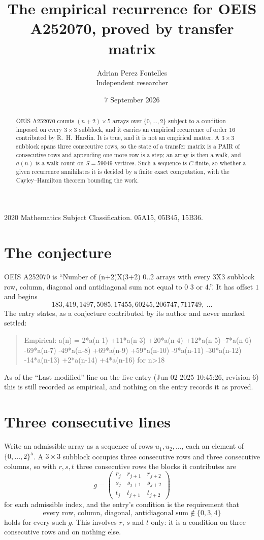 \documentclass[11pt,a4paper]{article}
\title{The empirical recurrence for OEIS A252070, proved by transfer matrix}
\author{Adrian Perez Fontelles\\ \small Independent researcher}
\date{7 September 2026}
\theoremstyle{plain}
\theoremstyle{definition}
\begin{document}
\maketitle

\begin{abstract}
OEIS A252070 counts $(n+2)\times5$ arrays over $\{0,\dots,2\}$ subject to a condition imposed on
every $3\times3$ subblock, and it carries an empirical recurrence of order $16$
contributed by R.~H.~Hardin. It is true, and it is not an empirical matter. A $3\times3$
subblock spans three consecutive rows, so the state of a transfer matrix is a PAIR of
consecutive rows and appending one more row is a step; an array is then a walk, and
$a(n)$ is a walk count on $S=59049$ vertices. Such a sequence is $C$-finite, so whether a given
recurrence annihilates it is decided by a finite exact computation, with the Cayley--Hamilton
theorem bounding the work.
\end{abstract}

\noindent\small 2020 Mathematics Subject Classification. 05A15, 05B45, 15B36.\normalsize

\section{The conjecture}

OEIS A252070 is ``Number of (n+2)X(3+2) 0..2 arrays with every 3X3 subblock row, column, diagonal and antidiagonal sum not equal to 0 3 or 4.''. It has offset $1$ and begins
\[
183, 419, 1497, 5085, 17455, 60245, 206747, 711749,\ \dots
\]
The entry states, as a conjecture contributed by its author and never marked settled:
\begin{quote}
Empirical: a(n) = 2*a(n-1) +11*a(n-3) +20*a(n-4) +12*a(n-5) -7*a(n-6) -69*a(n-7) -49*a(n-8) +69*a(n-9) +59*a(n-10) -9*a(n-11) -30*a(n-12) -14*a(n-13) +2*a(n-14) +4*a(n-16) for n>18
\end{quote}
As of the ``Last modified'' line on the live entry (Jun 02 2025 10:45:26, revision 6) this is still
recorded as empirical, and nothing on the entry records it as proved.

\section{Three consecutive lines}

Write an admissible array as a sequence of rows $u_1,u_2,\dots$, each an element of
$\{0,\dots,2\}^{5}$. A $3\times3$ subblock occupies three consecutive rows and
three consecutive columns, so with $r,s,t$ three consecutive rows the blocks it
contributes are
\[
g=\begin{pmatrix}r_j&r_{j+1}&r_{j+2}\\ s_j&s_{j+1}&s_{j+2}\\ t_j&t_{j+1}&t_{j+2}\end{pmatrix}
\]
for each admissible index, and the entry's condition is the requirement that
\[
\text{every row, column, diagonal, antidiagonal sum} \notin \{0,3,4\}
\]
holds for every such $g$. This involves $r$, $s$ and $t$ only: it is a condition on
three consecutive rows and on nothing else.
\end{document}
